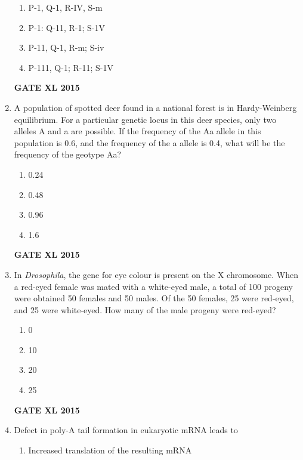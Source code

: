 \documentclass[journal,12pt,onecolumn]{IEEEtran}
\begin{document}
\begin{enumerate}
\begin{minipage}{0.5\textwidth}
\begin{flushleft}
	\end{flushleft}
	\end{minipage}
    \begin{enumerate}
		\item P-1, Q-1, R-IV, S-m
	    \item P-1: Q-11, R-1; S-1V
	    \item P-11, Q-1, R-m; S-iv
            \item P-111, Q-1; R-11; S-1V
    \end{enumerate}
\begin{flushright}\textbf{GATE XL 2015}\end{flushright}
\item A population of spotted deer found in a national forest is in Hardy-Weinberg equilibrium. For a particular genetic locus in this deer species, only two alleles A and a are possible. If the frequency of the Aa allele in this population is 0.6, and the frequency of the a allele is 0.4, what will be the frequency of the geotype Aa?
    \begin{enumerate}
            \item 0.24
	    \item 0.48
	    \item 0.96
            \item 1.6
    \end{enumerate}
\begin{flushright}\textbf{GATE XL 2015}\end{flushright}
\item In \textit{Drosophila}, the gene for eye colour is present on the X chromosome. When a red-eyed female was mated with a white-eyed male, a total of 100 progeny were obtained 50 females and 50 males. Of the 50 females, 25 were red-eyed, and 25 were white-eyed. How many of the male progeny were red-eyed?
    \begin{enumerate}
            \item 0
	    \item 10
	    \item 20
            \item 25
    \end{enumerate}
\begin{flushright}\textbf{GATE XL 2015}\end{flushright}
\item  Defect in poly-A tail formation in eukaryotic mRNA leads to
    \begin{enumerate}
            \item  Increased translation of the resulting mRNA

\end{enumerate}
\end{enumerate}
\end{document}
